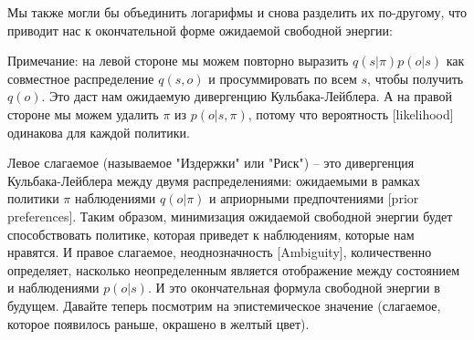 \documentclass[twoside,leqno, 11pt]{article}
\begin{document}
	
	Мы также могли бы объединить логарифмы и снова разделить их по-другому, что приводит нас к окончательной форме ожидаемой свободной энергии:
	
	
	\newpage
	
	\begin{figure}[h!]
	\end{figure}
	
	Примечание: на левой стороне мы можем повторно выразить $q(s|\pi) p(o|s)$ как совместное распределение $q(s,o)$ и просуммировать по всем $s$, чтобы получить $q(o)$. Это даст нам ожидаемую дивергенцию Кульбака-Лейблера. А на правой стороне мы можем удалить $\pi$ из $p(o|s,\pi)$, потому что вероятность [likelihood] одинакова для каждой политики.
	
	
	Левое слагаемое (называемое "Издержки" или "Риск") -- это дивергенция Кульбака-Лейблера между двумя распределениями: ожидаемыми в рамках политики $\pi$ наблюдениями $q(o|\pi)$ и априорными предпочтениями [prior preferences]. Таким образом, минимизация ожидаемой свободной энергии будет способствовать политике, которая приведет к наблюдениям, которые нам нравятся. И правое слагаемое, неоднозначность [Ambiguity], количественно определяет, насколько неопределенным является отображение между состоянием и наблюдениями $p(o|s)$. И это окончательная формула свободной энергии в будущем. Давайте теперь посмотрим на эпистемическое значение (слагаемое, которое появилось раньше, окрашено в желтый цвет).
	
\end{document}
